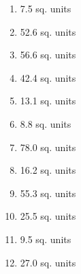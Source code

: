 \documentclass{article}
\begin{document}
\begin{enumerate}
    \item 7.5 sq. units
    \item 52.6 sq. units
    \item 56.6 sq. units
    \item 42.4 sq. units
    \item 13.1 sq. units
    \item 8.8 sq. units
    \item 78.0 sq. units
    \item 16.2 sq. units
    \item 55.3 sq. units
    \item 25.5 sq. units
    \item 9.5 sq. units
    \item 27.0 sq. units
\end{enumerate}
\end{document}
